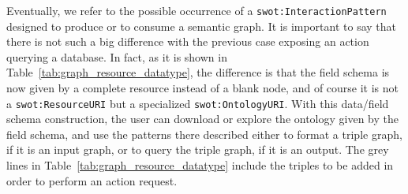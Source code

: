 Eventually, we refer to the possible occurrence of a \texttt{swot:InteractionPattern} designed to produce or to consume a semantic graph. It is important to say that there is not such a big difference with the previous case exposing an action querying a database. In fact, as it is shown in Table~\ref{tab:graph_resource_datatype}, the difference is that the field schema is now given by a complete resource instead of a blank node, and of course it is not a \texttt{swot:ResourceURI} but a specialized \texttt{swot:OntologyURI}. With this data/field schema construction, the user can download or explore the ontology given by the field schema, and use the patterns there described either to format a triple graph, if it is an input graph, or to query the triple graph, if it is an output. The grey lines in Table~\ref{tab:graph_resource_datatype} include the triples to be added in order to perform an action request.
